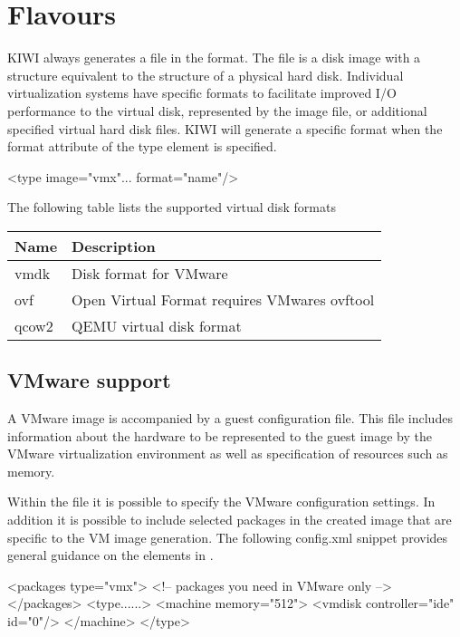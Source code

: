 \section{Flavours}

KIWI always generates a file in the  format. The  file is a disk
image with a structure equivalent to the structure of a physical hard disk. 
Individual virtualization systems have specific formats to facilitate
improved I/O performance to the virtual disk, represented by the image file,
or additional specified virtual hard disk files. KIWI will generate a 
specific format when the format attribute of the type element is specified.


\begin{xml}
<type image="vmx"... format="name"/>
\end{xml}

The following table lists the supported virtual disk formats

\begin{tabular}[h]{|p{2cm}|p{9cm}|}
\hline
\textbf{Name} & \textbf{Description} \\
\hline
vmdk\index{vmdk}\index{VMware!vmdk}       & Disk format for VMware \\
ovf\index{ovf}         & Open Virtual Format requires VMwares ovftool \\
qcow2\index{qcow2}     & QEMU virtual disk format  \\
\hline
\end{tabular}

\subsection{VMware support}
A VMware image is accompanied by a guest configuration file. This file 
includes information about the hardware to be represented to the guest 
image by the VMware virtualization environment as well as specification
of resources such as memory. 

Within the 
file it is possible to specify the VMware configuration
settings. In addition it is possible to include selected packages in the 
created image that are specific to the VM image generation. The following
config.xml snippet provides general guidance on the elements in .

\begin{xml}
<packages type="vmx">
   <!-- packages you need in VMware only -->
</packages>
<type......>
   <machine memory="512">
      <vmdisk controller="ide" id="0"/>
   </machine>
</type>
\end{xml}

